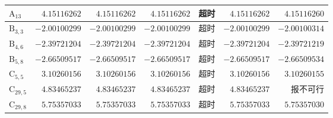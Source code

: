 \begin{table}[!htbp]
\begin{tabular*}{\textwidth}{@{\extracolsep{\fill}}lrrrrrr@{}}
$\mathrm{A}_{13}$ & $4.15116262$ & $4.15116262$ & $4.15116262$ & 超时 & $4.15116262$ & $4.15116260$ \\
\midrule
$\mathrm{B}_{3,3}$ & $-2.00100299$ & $-2.00100299$ & $-2.00100299$ & 超时 & $-2.00100299$ & $-2.00100314$ \\
$\mathrm{B}_{4,6}$ & $-2.39721204$ & $-2.39721204$ & $-2.39721204$ & 超时 & $-2.39721204$ & $-2.39721219$ \\
$\mathrm{B}_{5,8}$ & $-2.66509517$ & $-2.66509517$ & $-2.66509517$ & 超时 & $-2.66509517$ & $-2.66509534$ \\
\midrule
$\mathrm{C}_{5,5}$ & $3.10260156$ & $3.10260156$ & $3.10260156$ & 超时 & $3.10260156$ & $3.10260155$ \\
$\mathrm{C}_{29,5}$ & $4.83465237$ & $4.83465237$ & $4.83465237$ & 超时 & $4.83465237$ & 报不可行 \\
$\mathrm{C}_{29,8}$ & $5.75357033$ & $5.75357033$ & $5.75357033$ & 超时 & $5.75357033$ & $5.75357030$ \\
\bottomrule
\end{tabular*}
\end{table}
